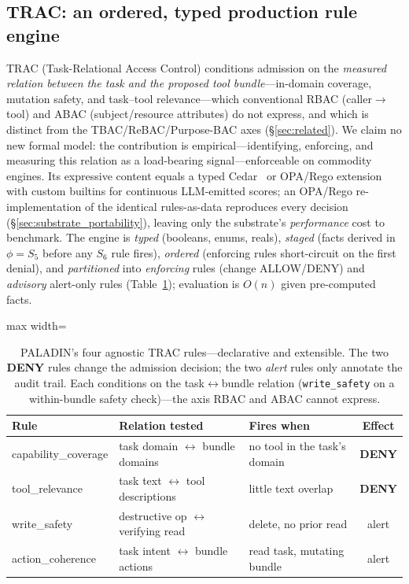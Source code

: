 \documentclass[sigconf,review,anonymous]{acmart}
\begin{document}
\subsection{TRAC: an ordered, typed production rule engine}
\label{sec:trac}

TRAC (Task-Relational Access Control) conditions admission on the \emph{measured relation between the task and the proposed tool bundle}---in-domain coverage, mutation safety, and task--tool relevance---which conventional RBAC (caller$\to$tool) and ABAC (subject/resource attributes) do not express, and which is distinct from the TBAC/ReBAC/Purpose-BAC axes (\S\ref{sec:related}). We claim no new formal model: the contribution is empirical---identifying, enforcing, and measuring this relation as a load-bearing signal---enforceable on commodity engines. Its expressive content equals a typed Cedar~\cite{cutler2024cedar} or OPA/Rego extension with custom builtins for continuous LLM-emitted scores; an OPA/Rego re-implementation of the identical rules-as-data reproduces every decision (\S\ref{sec:substrate_portability}), leaving only the substrate's \emph{performance} cost to benchmark. The engine is \emph{typed} (booleans, enums, reals), \emph{staged} (facts derived in $\phi=S_5$ before any $S_6$ rule fires), \emph{ordered} (enforcing rules short-circuit on the first denial), and \emph{partitioned} into \emph{enforcing} rules (change ALLOW/DENY) and \emph{advisory} alert-only rules (Table~\ref{tab:trac_rules}); evaluation is $O(n)$ given pre-computed facts.

\begin{table}[!t]
\centering
\caption{PALADIN's four agnostic TRAC rules---declarative and extensible. The two \textbf{DENY} rules change the admission decision; the two \emph{alert} rules only annotate the audit trail. Each conditions on the task$\leftrightarrow$bundle relation (\texttt{write\_safety} on a within-bundle safety check)---the axis RBAC and ABAC cannot express.}
\label{tab:trac_rules}
\footnotesize
\begin{adjustbox}{max width=\columnwidth}
\begin{tabular}{@{}lllc@{}}
\toprule
\textbf{Rule} & \textbf{Relation tested} & \textbf{Fires when} & \textbf{Effect} \\
\midrule
capability\_coverage & task domain $\leftrightarrow$ bundle domains & no tool in the task's domain & \textbf{DENY} \\
tool\_relevance      & task text $\leftrightarrow$ tool descriptions & little text overlap & \textbf{DENY} \\
write\_safety        & destructive op $\leftrightarrow$ verifying read & delete, no prior read & alert \\
action\_coherence    & task intent $\leftrightarrow$ bundle actions & read task, mutating bundle & alert \\
\bottomrule
\end{tabular}
\end{adjustbox}
\end{table}
\end{document}
